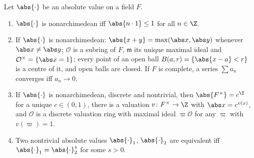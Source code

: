 \begin{proposition}\label{prop:local:absval}
Let $\abs{\cdot}$ be an absolute value on a field $F$.
\begin{enumerate}[label=(\roman*)]
\item $\abs{\cdot}$ is nonarchimedean iff $\abs{n\cdot1}\le1$ for all $n\in\Z$.
\item If $\abs{\cdot}$ is nonarchimedean: $\abs{x+y}=\max(\abs x,\abs y)$ whenever $\abs x\ne\abs y$; $\mathcal O$ is a subring of $F$,
$\mathfrak m$ its unique maximal ideal and $\mathcal O^\times=\{\abs x=1\}$; every point of an open ball $B(a,r)=\{\abs{x-a}<r\}$ is a
centre of it, and open balls are closed. If $F$ is complete, a series $\sum a_n$ converges iff $a_n\to0$.
\item If $\abs{\cdot}$ is nonarchimedean, discrete and nontrivial, then $\abs{F^\times}=c^{\Z}$ for a unique $c\in(0,1)$, there is a
valuation $v\colon F^\times\to\Z$ with $\abs x=c^{v(x)}$, and $\mathcal O$ is a discrete valuation ring with maximal ideal $\varpi\mathcal O$
for any $\varpi$ with $v(\varpi)=1$.
\item Two nontrivial absolute values $\abs{\cdot}_1$, $\abs{\cdot}_2$ are equivalent iff $\abs{\cdot}_1=\abs{\cdot}_2^{s}$ for some $s>0$.
\end{enumerate}
\end{proposition}

